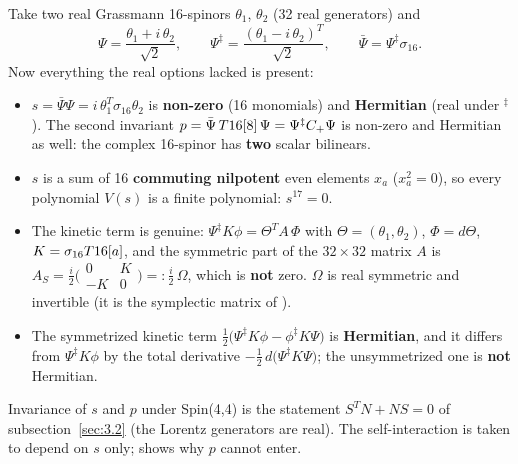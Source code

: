 Take two real Grassmann 16-spinors $\theta_1$, $\theta_2$ (32 real generators) and
\[
  \Psi=\frac{\theta_1+i\,\theta_2}{\sqrt2},\qquad
  \Psi^{\ddagger}=\frac{(\theta_1-i\,\theta_2)^{T}}{\sqrt2},\qquad
  \bar\Psi=\Psi^{\ddagger}\sigma_{16} .
\]
Now everything the real options lacked is present:
\begin{itemize}
  \item $s=\bar\Psi\Psi=i\,\theta_1^{T}\sigma_{16}\theta_2$ is \textbf{non-zero} (16 monomials) and
        \textbf{Hermitian} (real under ${}^{\ddagger}$). The second invariant
        $p=\bar\Psi\,T16[8]\,\Psi=\Psi^{\ddagger}C_+\Psi$ is non-zero and Hermitian as well: the
        complex 16-spinor has \textbf{two} scalar bilinears.
  \item $s$ is a sum of 16 \textbf{commuting nilpotent} even elements $x_a$ ($x_a^2=0$), so every
        polynomial $V(s)$ is a finite polynomial: $s^{17}=0$.
  \item The kinetic term is genuine: $\Psi^{\ddagger}K\phi=\Theta^{T}A\,\Phi$ with
        $\Theta=(\theta_1,\theta_2)$, $\Phi=d\Theta$, $K=\sigma_{16}T16[a]$, and the symmetric part
        of the $32\times32$ matrix $A$ is
        $A_S=\tfrac{i}{2}\bigl(\begin{smallmatrix}0&K\\-K&0\end{smallmatrix}\bigr)=:\tfrac{i}{2}\,\Omega$,
        which is \textbf{not} zero. $\Omega$ is real symmetric and invertible (it is the symplectic
        matrix of ).
  \item The symmetrized kinetic term $\tfrac12\bigl(\Psi^{\ddagger}K\phi-\phi^{\ddagger}K\Psi\bigr)$
        is \textbf{Hermitian}, and it differs from $\Psi^{\ddagger}K\phi$ by the total derivative
        $-\tfrac12\,d\bigl(\Psi^{\ddagger}K\Psi\bigr)$; the unsymmetrized one is \textbf{not}
        Hermitian.
\end{itemize}
Invariance of $s$ and $p$ under Spin(4,4) is the statement $S^{T}N+NS=0$ of
subsection~\ref{sec:3.2} (the Lorentz generators are real). The self-interaction is taken to depend
on $s$ only;  shows why $p$ cannot enter. 
